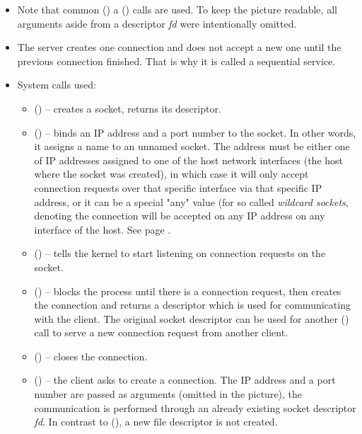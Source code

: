 \begin{itemize}
\item Note that common () a () calls are used.  To
keep the picture readable, all arguments aside from a descriptor \emph{fd} were
intentionally omitted.
\item The server creates one connection and does not accept a new one until the
previous connection finished.  That is why it is called a sequential service.
\item System calls used:
\begin{itemize}
\item {}() -- creates a socket, returns its descriptor.

\item {}() -- binds an IP address and a port number to the socket.
In other words, it assigns a name to an unnamed socket.  The address must be
either one of IP addresses assigned to one of the host network interfaces (the
host where the socket was created), in which case it will only accept connection
requests over that specific interface via that specific IP address, or it can be
a special "any" value (for so called \emph{wildcard sockets},
denoting the connection will be accepted on any IP address on any interface of
the host. See page \pageref{ANYADDR}.
\item {}() -- tells the kernel to start listening on connection
requests on the socket.
\item {}() -- blocks the process until there is a connection
request, then creates the connection and returns a  descriptor which
is used for communicating with the client.  The original socket descriptor can
be used for another () call to serve a new connection request from
another client.
\item {}() -- closes the connection.
\item {}() -- the client asks to create a connection.  The IP
address and a port number are passed as arguments (omitted in the picture), the
communication is performed through an already existing socket descriptor
\emph{fd}.  In contrast to (), a new file descriptor is not
created.
\end{itemize}
\end{itemize}



